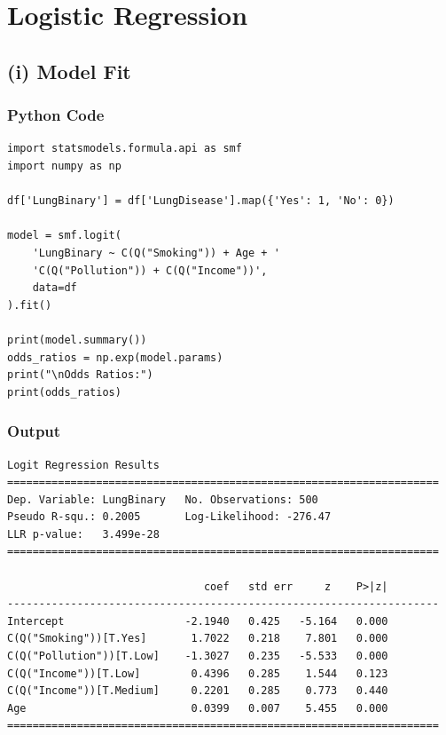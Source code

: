 \documentclass[12pt,a4paper]{article}
\begin{document}
\section{Logistic Regression}

\subsection{(i) Model Fit}

\subsubsection{Python Code}

\begin{lstlisting}[style=pythonstyle, caption={Logistic regression}]
import statsmodels.formula.api as smf
import numpy as np

df['LungBinary'] = df['LungDisease'].map({'Yes': 1, 'No': 0})

model = smf.logit(
    'LungBinary ~ C(Q("Smoking")) + Age + '
    'C(Q("Pollution")) + C(Q("Income"))',
    data=df
).fit()

print(model.summary())
odds_ratios = np.exp(model.params)
print("\nOdds Ratios:")
print(odds_ratios)
\end{lstlisting}

\subsubsection{Output}

\begin{lstlisting}[style=outputstyle]
Logit Regression Results
====================================================================
Dep. Variable: LungBinary   No. Observations: 500
Pseudo R-squ.: 0.2005       Log-Likelihood: -276.47
LLR p-value:   3.499e-28
====================================================================

                               coef   std err     z    P>|z|
--------------------------------------------------------------------
Intercept                   -2.1940   0.425   -5.164   0.000
C(Q("Smoking"))[T.Yes]       1.7022   0.218    7.801   0.000
C(Q("Pollution"))[T.Low]    -1.3027   0.235   -5.533   0.000
C(Q("Income"))[T.Low]        0.4396   0.285    1.544   0.123
C(Q("Income"))[T.Medium]     0.2201   0.285    0.773   0.440
Age                          0.0399   0.007    5.455   0.000
====================================================================
\end{lstlisting}
\end{document}
